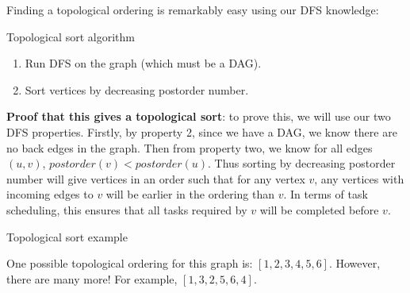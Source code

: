 \documentclass{article}
\begin{document}
Finding a topological ordering is remarkably easy using our DFS knowledge:

\begin{strategy}{Topological sort algorithm}
    \begin{enumerate}
        \item Run DFS on the graph (which must be a DAG).
        \item Sort vertices by decreasing postorder number.
    \end{enumerate}   
\end{strategy}

\textbf{Proof that this gives a topological sort}: to prove this, we will use our two DFS properties. Firstly, by property 2, since we have a DAG, we know there are no back edges in the graph. Then from property two, we know for all edges $(u, v)$, $postorder(v) < postorder(u)$. Thus sorting by decreasing postorder number will give vertices in an order such that for any vertex $v$, any vertices with incoming edges to $v$ will be earlier in the ordering than $v$. In terms of task scheduling, this ensures that all tasks required by $v$ will be completed before $v$.

\begin{example}{Topological sort example} 
    \centering
    \begin{minipage}{0.4\linewidth}
    \centering
    \end{minipage}
    \begin{minipage}{0.4\linewidth}
    \centering
    One possible topological ordering for this graph is: $[1, 2, 3, 4, 5, 6]$. However, there are many more! For example, $[1, 3, 2, 5, 6, 4]$.
    \end{minipage}
\end{example}


\newpage
\end{document}
